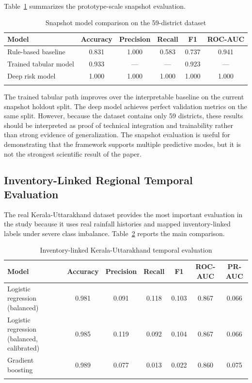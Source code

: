 \documentclass[pdflatex,sn-mathphys-num]{sn-jnl}
\begin{document}
Table~\ref{tab:snapshot_results} summarizes the prototype-scale snapshot evaluation.

\begin{table}[h]
\caption{Snapshot model comparison on the 59-district dataset}
\label{tab:snapshot_results}
\begin{tabular}{@{}lccccc@{}}
\toprule
Model & Accuracy & Precision & Recall & F1 & ROC-AUC \\
\midrule
Rule-based baseline & 0.831 & 1.000 & 0.583 & 0.737 & 0.941 \\
Trained tabular model & 0.933 & --- & --- & 0.923 & --- \\
Deep risk model & 1.000 & 1.000 & 1.000 & 1.000 & 1.000 \\
\botrule
\end{tabular}
\end{table}

The trained tabular path improves over the interpretable baseline on the current snapshot holdout split. The deep model achieves perfect validation metrics on the same split. However, because the dataset contains only 59 districts, these results should be interpreted as proof of technical integration and trainability rather than strong evidence of generalization. The snapshot evaluation is useful for demonstrating that the framework supports multiple predictive modes, but it is not the strongest scientific result of the paper.

\subsection{Inventory-Linked Regional Temporal Evaluation}

The real Kerala-Uttarakhand dataset provides the most important evaluation in the study because it uses real rainfall histories and mapped inventory-linked labels under severe class imbalance. Table~\ref{tab:temporal_results} reports the main comparison.

\begin{table}[h]
\caption{Inventory-linked Kerala-Uttarakhand temporal evaluation}
\label{tab:temporal_results}
\begin{tabular}{@{}lcccccc@{}}
\toprule
Model & Accuracy & Precision & Recall & F1 & ROC-AUC & PR-AUC \\
\midrule
Logistic regression (balanced) & 0.981 & 0.091 & 0.118 & 0.103 & 0.867 & 0.066 \\
Logistic regression (balanced, calibrated) & 0.985 & 0.119 & 0.092 & 0.104 & 0.867 & 0.066 \\
Gradient boosting & 0.989 & 0.077 & 0.013 & 0.022 & 0.860 & 0.075 \\
\botrule
\end{tabular}
\end{table}
\end{document}
